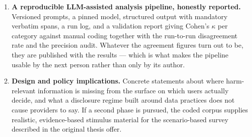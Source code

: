 \begin{enumerate}[leftmargin=*,itemsep=5pt]
  \item \textbf{A reproducible LLM-assisted analysis pipeline, honestly
    reported.} Versioned prompts, a pinned model, structured output with
    mandatory verbatim spans, a run log, and a validation report giving Cohen's
    $\kappa$ per category against manual coding together with the run-to-run
    disagreement rate and the precision audit. Whatever the agreement figures
    turn out to be, they are published with the results --- which is what makes
    the pipeline usable by the next person rather than only by its author.

  \item \textbf{Design and policy implications.} Concrete statements about where
    harm-relevant information is missing from the surface on which users
    actually decide, and what a disclosure regime built around data practices
    does not cause providers to say. If a second phase is pursued, the coded
    corpus supplies realistic, evidence-based stimulus material for the
    scenario-based survey described in the original thesis offer.
\end{enumerate}
